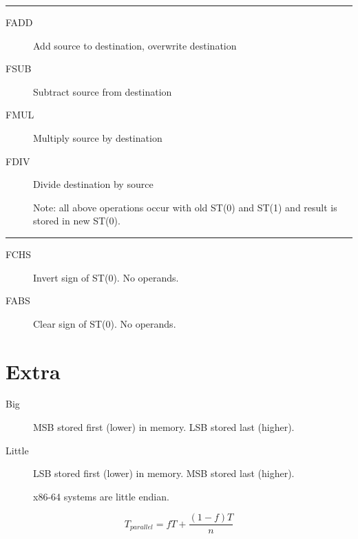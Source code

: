 \documentclass[10pt,landscape]{article}
\newcommand{\mysep}{\vspace{0.1cm}\hrule\vspace{0.1cm}}
\begin{document}
\begin{multicols*}{3}
\mysep

\begin{description}
  \item[FADD] Add source to destination, overwrite destination
  \item[FSUB] Subtract source from destination
  \item[FMUL] Multiply source by destination
  \item[FDIV] Divide destination by source
  \item[] Note: all above operations occur with old ST(0) and ST(1) and result
    is stored in new ST(0). 
\end{description}

\mysep

\begin{description}
  \item[FCHS] Invert sign of ST(0). No operands.
  \item[FABS] Clear sign of ST(0). No operands.
\end{description}

\section{Extra}

\begin{description}
  \item[Big] MSB stored first (lower) in memory. LSB stored last (higher).
  \item[Little] LSB stored first (lower) in memory. MSB stored last (higher).
  \item[] x86-64 systems are little endian.
\end{description}

$$T_{parallel} = fT + \frac{(1-f)T}{n}$$

\end{multicols*}
\end{document}
